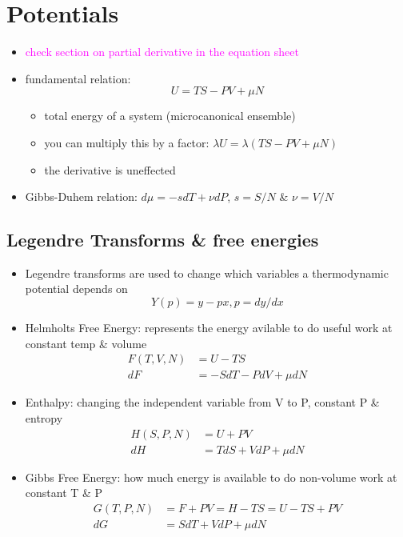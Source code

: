 
\section{Potentials}


\begin{itemize}
    \item \textcolor{magenta}{check section on partial derivative in the equation sheet}
    \item fundamental relation:
    \begin{equation}
        U = TS - PV + \mu N
    \end{equation}
    \begin{itemize}
        \item total energy of a system (microcanonical ensemble)
        \item you can multiply this by a factor: $\lambda U = \lambda (TS - PV + \mu N)$
        \item the derivative is uneffected 
    \end{itemize}
    \item Gibbs-Duhem relation: $d\mu = -s dT + \nu dP$, $s = S/N$ \& $\nu = V/N$
\end{itemize}

\subsection*{Legendre Transforms \& free energies}
\begin{itemize}
    \item Legendre transforms are used to change which variables a thermodynamic potential depends on
    \begin{equation*}
        Y(p) = y - px, p = dy/dx
    \end{equation*}
    \item Helmholts Free Energy: represents the energy avilable to do useful work at constant temp \& volume
    \begin{align*}
        F(T,V, N) &= U - TS \\
        dF &= -S dT - P dV + \mu dN
    \end{align*}

    \item Enthalpy: changing the independent variable from V to P, constant P \& entropy 
    \begin{align*}
        H(S, P, N) &= U + PV \\
        dH &= T dS + V dP + \mu dN 
    \end{align*}

    \item Gibbs Free Energy: how much energy is available to do non-volume work at constant T \& P
    \begin{align*}
        G(T, P, N) &= F + PV = H - TS = U -TS + PV \\
        dG &= S dT + V dP + \mu dN 
    \end{align*}

\end{itemize}

